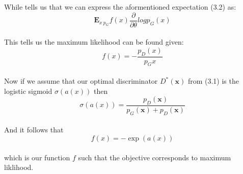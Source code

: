 \documentclass{amsart}
\numberwithin{equation}{section}
\theoremstyle{definition}
\theoremstyle{remark}
\begin{document}
While tells us that we can express the aformentioned expectation (3.2) as: \\

\begin{equation}
\mathbf{E}_{x ~ p_G} f(x) \frac{\partial}{\partial \theta} log {p_G}(x)
\end{equation} \\

This tells us the maximum likelihood can be found given: \\

\begin{equation}
f(x) = - \frac{p_D(x)}{p_G{x}}
\end{equation} \\

Now if we assume that our optimal discriminator $D^*(\mathbf{x})$ from (3.1) is the logistic sigmoid $\sigma(a(x))$ then \\

\begin{equation}
\sigma(a(x)) = \frac{p_D(\mathbf{x})}{p_G(\mathbf{x}) + p_D(\mathbf{x})}
\end{equation} \\

And it follows that \\

\begin{equation}
f(x) = -\exp(a(x))
\end{equation} \\

which is our function $f$ such that the objective corresponds to maximum liklihood.

\end{document}
